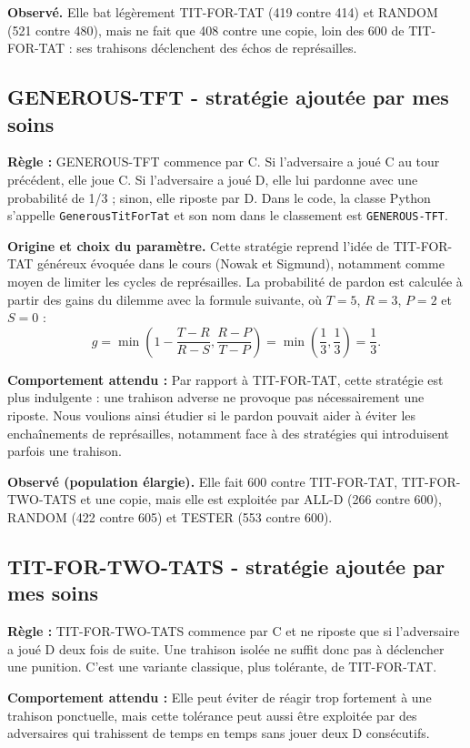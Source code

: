 \documentclass[10pt,a4paper]{article}
\begin{document}
\textbf{Observé.} Elle bat légèrement TIT-FOR-TAT (419 contre 414) et RANDOM (521 contre 480), mais ne fait que 408 contre une
copie, loin des 600 de TIT-FOR-TAT : ses trahisons déclenchent des échos de représailles.

\subsection{GENEROUS-TFT - stratégie ajoutée par mes soins}
\textbf{Règle :} GENEROUS-TFT commence par C. Si l'adversaire a joué C au tour précédent, elle joue C. Si l'adversaire a joué D,
elle lui pardonne avec une probabilité de 1/3 ; sinon, elle riposte par D. Dans le code, la classe Python s'appelle
\texttt{GenerousTitForTat} et son nom dans le classement est \texttt{GENEROUS-TFT}.

\textbf{Origine et choix du paramètre.} Cette stratégie reprend l'idée de TIT-FOR-TAT généreux évoquée dans le cours
(Nowak et Sigmund), notamment comme moyen de limiter les cycles de représailles. La probabilité de pardon est calculée à partir
des gains du dilemme avec la formule suivante, où $T=5$, $R=3$, $P=2$ et $S=0$ :
\[
g = \min\left(1-\frac{T-R}{R-S},\frac{R-P}{T-P}\right)
  = \min\left(\frac{1}{3},\frac{1}{3}\right)=\frac{1}{3}.
\]

\textbf{Comportement attendu :} Par rapport à TIT-FOR-TAT, cette stratégie est plus indulgente : une trahison adverse ne provoque
pas nécessairement une riposte. Nous voulions ainsi étudier si le pardon pouvait aider à éviter les enchaînements de
représailles, notamment face à des stratégies qui introduisent parfois une trahison.

\textbf{Observé (population élargie).} Elle fait 600 contre TIT-FOR-TAT, TIT-FOR-TWO-TATS et une copie, mais elle est exploitée
par ALL-D (266 contre 600), RANDOM (422 contre 605) et TESTER (553 contre 600).

\subsection{TIT-FOR-TWO-TATS - stratégie ajoutée par mes soins}
\textbf{Règle :} TIT-FOR-TWO-TATS commence par C et ne riposte que si l'adversaire a joué D deux fois de suite. Une trahison
isolée ne suffit donc pas à déclencher une punition. C'est une variante classique, plus tolérante, de TIT-FOR-TAT.

\textbf{Comportement attendu :} Elle peut éviter de réagir trop fortement à une trahison ponctuelle, mais cette tolérance peut
aussi être exploitée par des adversaires qui trahissent de temps en temps sans jouer deux D consécutifs.
\end{document}
